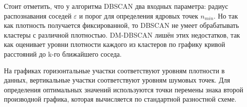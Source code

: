 \documentclass{article}
\begin{document}
Стоит отметить, что у алгоритма DBSCAN два входных параметра: радиус распознавания соседей $\varepsilon$ и порог для определения ядровых точек $n_{min}$. Но так как плотность получается фиксированной, то DBSCAN не умеет обрабатывать кластеры с различной плотностью. DM-DBSCAN лишён этих недостатков, так как оценивает уровни плотности каждого из кластеров по графику кривой расстояний до k-го ближайшего соседа. 

\begin{figure}[H]
\noindent{}
\end{figure}
На графиках горизонтальные участки соответствуют уровням плотности в данных, вертикальные участки соответствуют уровням шумовых точек. Для определения оптимальных значений используются точки перемены знака второй производной графика, которая вычисляется по стандартной разностной схеме. 
\end{document}
